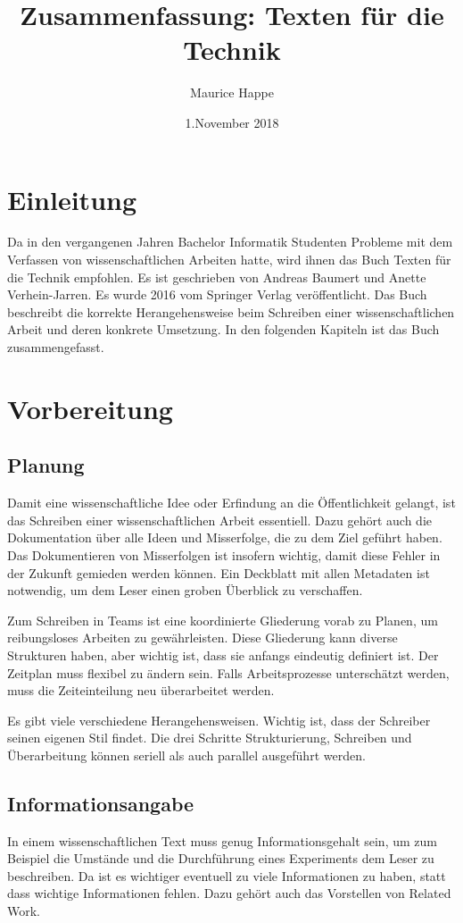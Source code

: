 \documentclass{article}
\title{Zusammenfassung: Texten für die Technik}
\author{Maurice Happe}
\date{1.November 2018}
\begin{document}
\maketitle

\section{Einleitung}
Da in den vergangenen Jahren Bachelor Informatik Studenten Probleme mit dem Verfassen von wissenschaftlichen Arbeiten hatte, wird ihnen das Buch \glqq Texten für die Technik\grqq{}  empfohlen. Es ist geschrieben von Andreas Baumert und Anette Verhein-Jarren. Es wurde 2016 vom Springer Verlag veröffentlicht.
Das Buch beschreibt die korrekte Herangehensweise beim Schreiben einer wissenschaftlichen Arbeit und deren konkrete Umsetzung.
In den folgenden Kapiteln ist das Buch zusammengefasst.
\section{Vorbereitung}
\subsection{Planung}
Damit eine wissenschaftliche Idee oder Erfindung an die Öffentlichkeit gelangt, ist das Schreiben einer wissenschaftlichen Arbeit essentiell.
Dazu gehört auch die Dokumentation über alle Ideen und Misserfolge, die zu dem Ziel geführt haben. Das Dokumentieren von Misserfolgen ist insofern wichtig, damit diese Fehler in der Zukunft gemieden werden können.
Ein Deckblatt mit allen Metadaten ist notwendig, um dem Leser einen groben Überblick zu verschaffen.

Zum Schreiben in Teams ist eine koordinierte Gliederung vorab zu Planen, um reibungsloses Arbeiten zu gewährleisten. Diese Gliederung kann diverse Strukturen haben, aber wichtig ist, dass sie anfangs eindeutig definiert ist.
Der Zeitplan muss flexibel zu ändern sein. Falls Arbeitsprozesse unterschätzt werden, muss die Zeiteinteilung neu überarbeitet werden.

Es gibt viele verschiedene Herangehensweisen. Wichtig ist, dass der Schreiber seinen eigenen Stil findet. Die drei Schritte \glqq Strukturierung, Schreiben und Überarbeitung\grqq{} können seriell als auch parallel ausgeführt werden.

\subsection{Informationsangabe}
In einem wissenschaftlichen Text muss genug Informationsgehalt sein, um zum Beispiel die Umstände und die Durchführung eines Experiments dem Leser zu beschreiben. Da ist es wichtiger eventuell zu viele Informationen zu haben, statt dass wichtige Informationen fehlen. Dazu gehört auch das Vorstellen von Related Work. 
\end{document}
